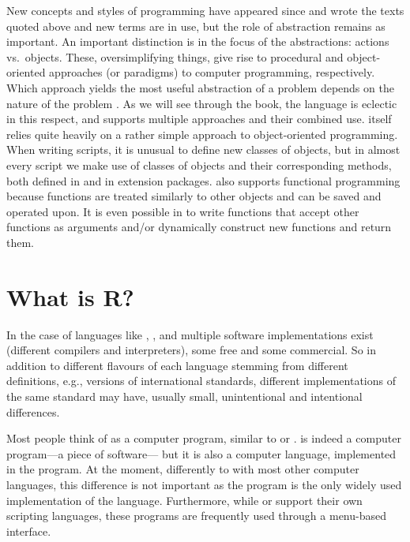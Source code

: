 \documentclass[krantz2]{krantz}\usepackage{knitr}
\begin{document}
\begin{explainbox}
New concepts and styles of programming have appeared since \citeauthor{Wirth1974} and \citeauthor{Zimmer1985} wrote the texts quoted above and new terms are in use, but the role of abstraction remains as important. An important distinction is in the focus of the abstractions: actions vs.\ objects. These, oversimplifying things, give rise to procedural and object-oriented approaches (or paradigms) to computer programming, respectively. Which approach yields the most useful abstraction of a problem depends on the nature of the problem \autocite[see][]{Coplien1999}. As we will see through the book, the \Rlang language is eclectic in this respect, and supports multiple approaches and their combined use. \Rlang itself relies quite heavily on a rather simple approach to object-oriented programming. When writing scripts, it is unusual to define new classes of objects, but in almost every script we make use of classes of objects and their corresponding methods, both defined in \Rlang and in extension packages. \Rlang also supports functional programming because functions are treated similarly to other objects and can be saved and operated upon. It is even possible in \Rlang to write functions that accept other functions as arguments and/or dynamically construct new functions and return them.
\end{explainbox}

\section{What is R?}

In the case of languages like \Cpplang, \Clang, \pascallang and  multiple software implementations exist (different compilers and interpreters), some free and some commercial. So in addition to different flavours of each language stemming from different definitions, e.g., versions of international standards, different implementations of the same standard may have, usually small, unintentional and intentional differences.

Most people think
of \Rpgrm as a computer program, similar to  or . \Rpgrm is indeed a computer program---a piece of software--- but it is also a computer language, implemented in the \Rpgrm program. At the moment, differently to with most other computer languages, this difference is not important as the \Rpgrm program is the only widely used implementation of the \Rlang language. Furthermore, while  or  support their own scripting languages, these programs are frequently used through a menu-based interface.
\end{document}
